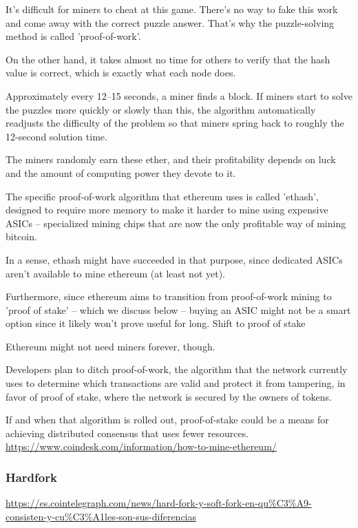 \documentclass[11pt,a4paper]{article}
\begin{document}
It's difficult for miners to cheat at this game. There's no way to fake this work and come away with the correct puzzle answer. That's why the puzzle-solving method is called 'proof-of-work'.

On the other hand, it takes almost no time for others to verify that the hash value is correct, which is exactly what each node does.

Approximately every 12–15 seconds, a miner finds a block. If miners start to solve the puzzles more quickly or slowly than this, the algorithm automatically readjusts the difficulty of the problem so that miners spring back to roughly the 12-second solution time.

The miners randomly earn these ether, and their profitability depends on luck and the amount of computing power they devote to it.

The specific proof-of-work algorithm that ethereum uses is called 'ethash', designed to require more memory to make it harder to mine using expensive ASICs – specialized mining chips that are now the only profitable way of mining bitcoin.

In a sense, ethash might have succeeded in that purpose, since dedicated ASICs aren't available to mine ethereum (at least not yet).

Furthermore, since ethereum aims to transition from proof-of-work mining to 'proof of stake' – which we discuss below – buying an ASIC might not be a smart option since it likely won’t prove useful for long.
Shift to proof of stake

Ethereum might not need miners forever, though.

Developers plan to ditch proof-of-work, the algorithm that the network currently uses to determine which transactions are valid and protect it from tampering, in favor of proof of stake, where the network is secured by the owners of tokens.

If and when that algorithm is rolled out, proof-of-stake could be a means for achieving distributed consensus that uses fewer resources.\\
\url{https://www.coindesk.com/information/how-to-mine-ethereum/}

\subsubsection{Hardfork}
\label{sec:hardfork}
\url{https://es.cointelegraph.com/news/hard-fork-y-soft-fork-en-qu\%C3\%A9-consisten-y-cu\%C3\%A1les-son-sus-diferencias}
\end{document}

